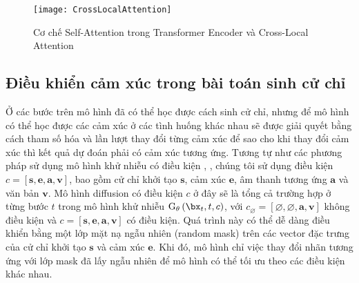 \begin{figure}
	\centering
	\texttt{[image: CrossLocalAttention]}
	\vspace{-10pt}
	\caption{Cơ chế Self-Attention trong Transformer Encoder và Cross-Local Attention}
	\label{fig:CrossLocalAttention}
	\vspace{-10pt}
\end{figure}











\subsection{Điều khiển cảm xúc trong bài toán sinh cử chỉ}

Ở các bước trên mô hình đã có thể học được cách sinh cử chỉ, nhưng để mô hình có thể học được các cảm xúc ở các tình huống khác nhau sẽ được giải quyết bằng cách tham số hóa và lần lượt thay đổi từng cảm xúc để sao cho khi thay đổi cảm xúc thì kết quả dự đoán phải có cảm xúc tương ứng.
Tương tự như các phương pháp sử dụng mô hình khử nhiễu có điều kiện \cite{ho2022classifier}, \cite{tevet2022human}, chúng tôi sử dụng điều kiện $c = [ \mathbf{s}, \mathbf{e}, \mathbf{a}, \mathbf{v} ]$,  bao gồm cử chỉ khởi tạo $\mathbf{s}$, cảm xúc $\mathbf{e}$, âm thanh tương ứng $\mathbf{a}$ và văn bản $\mathbf{v}$. Mô hình diffusion có điều kiện $c$ ở đây sẽ là tổng cả trường hợp ở từng bước $t$ trong mô hình khử nhiễu $\text{G}_\theta \left( \bx_{t}, t, c \right)$, với  $c_\varnothing=[\varnothing, \varnothing, \mathbf{a}, \mathbf{v}]$ không điều kiện và $c = [\mathbf{s}, \mathbf{e}, \mathbf{a}, \mathbf{v}]$ có điều kiện. Quá trình này có thể dễ dàng điều khiển bằng một lớp mặt nạ ngẫu nhiên (random mask) trên các vector đặc trưng của cử chỉ khởi tạo $\mathbf{s}$ và cảm xúc $\mathbf{e}$. Khi đó, mô hình chỉ việc thay đổi nhãn tương ứng với lớp mask đã lấy ngẫu nhiên để mô hình có thể tối ưu theo các điều kiện khác nhau. 

